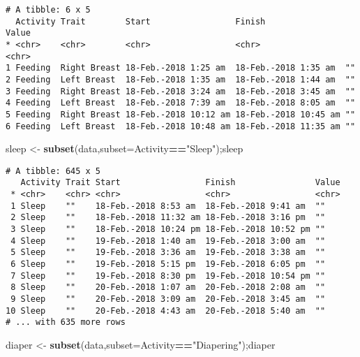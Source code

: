 \documentclass[10,portrait]{article}
\newenvironment{Shaded}{\begin{snugshade}}{\end{snugshade}}
\newcommand{\KeywordTok}[1]{\textcolor[rgb]{0.13,0.29,0.53}{\textbf{#1}}}
\newcommand{\DataTypeTok}[1]{\textcolor[rgb]{0.13,0.29,0.53}{#1}}
\newcommand{\StringTok}[1]{\textcolor[rgb]{0.31,0.60,0.02}{#1}}
\newcommand{\OperatorTok}[1]{\textcolor[rgb]{0.81,0.36,0.00}{\textbf{#1}}}
\newcommand{\NormalTok}[1]{#1}
\begin{document}
\begin{verbatim}
# A tibble: 6 x 5
  Activity Trait        Start                 Finish                Value
* <chr>    <chr>        <chr>                 <chr>                 <chr>
1 Feeding  Right Breast 18-Feb.-2018 1:25 am  18-Feb.-2018 1:35 am  ""   
2 Feeding  Left Breast  18-Feb.-2018 1:35 am  18-Feb.-2018 1:44 am  ""   
3 Feeding  Right Breast 18-Feb.-2018 3:24 am  18-Feb.-2018 3:45 am  ""   
4 Feeding  Left Breast  18-Feb.-2018 7:39 am  18-Feb.-2018 8:05 am  ""   
5 Feeding  Right Breast 18-Feb.-2018 10:12 am 18-Feb.-2018 10:45 am ""   
6 Feeding  Left Breast  18-Feb.-2018 10:48 am 18-Feb.-2018 11:35 am ""   
\end{verbatim}

\begin{Shaded}
\begin{Highlighting}[]
\NormalTok{sleep <-}\StringTok{ }\KeywordTok{subset}\NormalTok{(data,}\DataTypeTok{subset=}\NormalTok{Activity}\OperatorTok{==}\StringTok{"Sleep"}\NormalTok{);sleep}
\end{Highlighting}
\end{Shaded}

\begin{verbatim}
# A tibble: 645 x 5
   Activity Trait Start                 Finish                Value
 * <chr>    <chr> <chr>                 <chr>                 <chr>
 1 Sleep    ""    18-Feb.-2018 8:53 am  18-Feb.-2018 9:41 am  ""   
 2 Sleep    ""    18-Feb.-2018 11:32 am 18-Feb.-2018 3:16 pm  ""   
 3 Sleep    ""    18-Feb.-2018 10:24 pm 18-Feb.-2018 10:52 pm ""   
 4 Sleep    ""    19-Feb.-2018 1:40 am  19-Feb.-2018 3:00 am  ""   
 5 Sleep    ""    19-Feb.-2018 3:36 am  19-Feb.-2018 3:38 am  ""   
 6 Sleep    ""    19-Feb.-2018 5:15 pm  19-Feb.-2018 6:05 pm  ""   
 7 Sleep    ""    19-Feb.-2018 8:30 pm  19-Feb.-2018 10:54 pm ""   
 8 Sleep    ""    20-Feb.-2018 1:07 am  20-Feb.-2018 2:08 am  ""   
 9 Sleep    ""    20-Feb.-2018 3:09 am  20-Feb.-2018 3:45 am  ""   
10 Sleep    ""    20-Feb.-2018 4:43 am  20-Feb.-2018 5:40 am  ""   
# ... with 635 more rows
\end{verbatim}

\begin{Shaded}
\begin{Highlighting}[]
\NormalTok{diaper <-}\StringTok{ }\KeywordTok{subset}\NormalTok{(data,}\DataTypeTok{subset=}\NormalTok{Activity}\OperatorTok{==}\StringTok{"Diapering"}\NormalTok{);diaper}
\end{Highlighting}
\end{Shaded}
\end{document}
